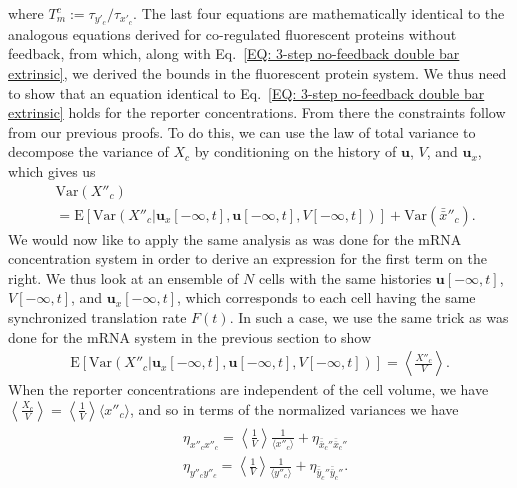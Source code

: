 \documentclass[%
 reprint,prx,
superscriptaddress,
%
%
%
%
%
%
%
%
%
 amsmath,amssymb,
 aps,
%
%
%
%
%
%
]{revtex4-2}
\begin{document}
{{where $T_{m}^{c} := \tau_{y'_{c}}/\tau_{x'_{c}}$. The last four equations are mathematically identical to the analogous equations derived for co-regulated fluorescent proteins without feedback, from which, along with Eq.~\eqref{EQ: 3-step no-feedback double bar extrinsic}, we derived the bounds in the fluorescent protein system. We thus need to show that an equation identical to Eq.~\eqref{EQ: 3-step no-feedback double bar extrinsic} holds for the reporter concentrations. From there the constraints follow from our previous proofs. To do this, we can use the law of total variance to decompose the variance of $X_{c}$ by conditioning on the history of $\mathbf{u}$, $V$, and $\mathbf{u}_{x}$, which gives us
\begin{align*}
 &\text{Var}(X''_{c}) \\
 &= \mathrm{E}\left[ \text{Var}(X''_{c}|\mathbf{u}_{x}[-\infty,t], \mathbf{u}[-\infty,t], V[-\infty,t]) \right ] 
 +  \text{Var}(\bar{\bar{x}}''_{c}) .
\end{align*}
We would now like to apply the same analysis as was done for the mRNA concentration system in order to derive an expression 
for the first term on the right. We thus look at an ensemble of $N$ cells with the same histories $\mathbf{u}[-\infty,t]$, $V[-\infty,t]$, and $\mathbf{u}_{x}[-\infty,t]$, 
which corresponds to each cell having the same synchronized translation rate $F(t)$. In such a case, we use the same trick as was done for the mRNA system in the previous section to show
\begin{align*}
\mathrm{E}\left[ \text{Var}(X''_{c}|\mathbf{u}_{x}[-\infty,t], \mathbf{u}[-\infty,t], V[-\infty,t]) \right ] = \left \langle \frac{X''_{c}}{V}\right \rangle .
\end{align*}
When the reporter concentrations are independent of the cell volume, we have $\left \langle \frac{X_{c}}{V}\right \rangle = \left \langle \frac{1}{V}\right \rangle \langle x''_{c} \rangle$, and so in 
terms of the normalized variances we have 
\begin{align}
\begin{split}
 &\eta_{x''_{c}x''_{c}} = \left \langle \frac{1}{V}\right \rangle \frac{1}{\langle x''_{c} \rangle} +  \eta_{\bar{\bar{x}}_{c}''\bar{\bar{x}}_{c}'' } \\ &\eta_{y''_{c}y''_{c}} = \left \langle \frac{1}{V}\right \rangle \frac{1}{\langle y''_{c} \rangle} +  \eta_{\bar{\bar{y}}_{c}''\bar{\bar{y}}_{c}'' } . 
 \end{split}
 \label{EQ: FP concentration eta}
\end{align}
}}
\end{document}
